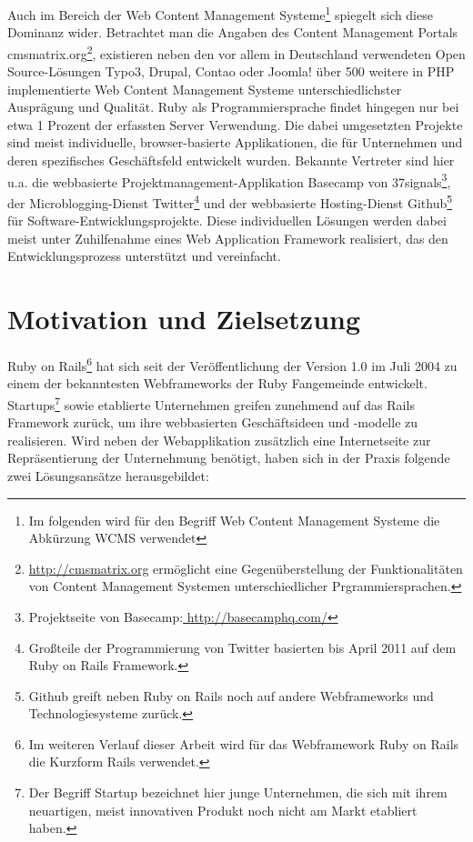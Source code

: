 Auch im Bereich der Web Content Management Systeme\footnote{Im folgenden wird für den Begriff Web Content Management Systeme die Abkürzung WCMS verwendet} spiegelt sich diese Dominanz wider. Betrachtet man die Angaben des Content Management Portals cmsmatrix.org\footnote{\href{http://cmsmatrix.org}{http://cmsmatrix.org} ermöglicht eine Gegenüberstellung der Funktionalitäten von Content Management Systemen unterschiedlicher Prgrammiersprachen.}, existieren neben den vor allem in Deutschland verwendeten Open Source-Lösungen Typo3, Drupal, Contao oder Joomla! über 500 weitere in PHP implementierte Web Content Management Systeme unterschiedlichster Ausprägung und Qualität.
Ruby als Programmiersprache findet hingegen nur bei etwa 1 Prozent der erfassten Server Verwendung. Die dabei umgesetzten Projekte sind meist individuelle, browser-basierte Applikationen, die für Unternehmen und deren spezifisches Geschäftsfeld entwickelt wurden. Bekannte Vertreter sind hier u.a. die webbasierte Projektmanagement-Applikation Basecamp von 37signals\footnote{Projektseite von Basecamp:\href{http://basecamphq.com}{ http://basecamphq.com/}}, der Microblogging-Dienst Twitter\footnote{
Großteile der Programmierung von Twitter basierten bis April 2011 auf dem Ruby on Rails Framework.} und der webbasierte Hosting-Dienst Github\footnote{Github greift neben Ruby on Rails noch auf andere Webframeworks und Technologiesysteme zurück.
} für Software-Entwicklungsprojekte.
Diese individuellen Lösungen werden dabei meist unter Zuhilfenahme  eines Web Application Framework realisiert, das den Entwicklungsprozess unterstützt und vereinfacht.



\section{Motivation und Zielsetzung}

Ruby on Rails\footnote{Im weiteren Verlauf dieser Arbeit wird für das Webframework Ruby on Rails die Kurzform Rails verwendet.} hat sich seit der Veröffentlichung der Version 1.0 im Juli 2004 zu einem der bekanntesten Webframeworks der Ruby Fangemeinde entwickelt.
Startups\footnote{Der Begriff Startup bezeichnet hier junge Unternehmen, die sich mit ihrem neuartigen, meist innovativen Produkt noch nicht am Markt etabliert haben.} sowie etablierte Unternehmen greifen zunehmend auf das Rails Framework zurück, um ihre webbasierten Geschäftsideen und -modelle zu realisieren.
Wird neben der Webapplikation zusätzlich eine Internetseite zur Repräsentierung der Unternehmung benötigt, haben sich in der Praxis folgende zwei Lösungsansätze herausgebildet:

